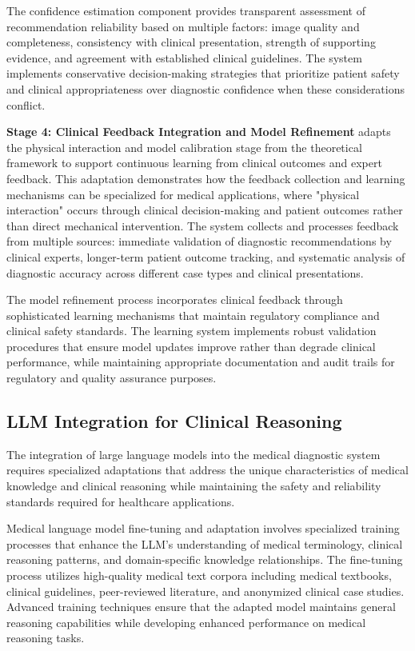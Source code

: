 The confidence estimation component provides transparent assessment of recommendation reliability based on multiple factors: image quality and completeness, consistency with clinical presentation, strength of supporting evidence, and agreement with established clinical guidelines. The system implements conservative decision-making strategies that prioritize patient safety and clinical appropriateness over diagnostic confidence when these considerations conflict.

\textbf{Stage 4: Clinical Feedback Integration and Model Refinement} adapts the physical interaction and model calibration stage from the theoretical framework to support continuous learning from clinical outcomes and expert feedback. This adaptation demonstrates how the feedback collection and learning mechanisms can be specialized for medical applications, where "physical interaction" occurs through clinical decision-making and patient outcomes rather than direct mechanical intervention. The system collects and processes feedback from multiple sources: immediate validation of diagnostic recommendations by clinical experts, longer-term patient outcome tracking, and systematic analysis of diagnostic accuracy across different case types and clinical presentations.

The model refinement process incorporates clinical feedback through sophisticated learning mechanisms that maintain regulatory compliance and clinical safety standards. The learning system implements robust validation procedures that ensure model updates improve rather than degrade clinical performance, while maintaining appropriate documentation and audit trails for regulatory and quality assurance purposes.

\subsection{LLM Integration for Clinical Reasoning}

The integration of large language models into the medical diagnostic system requires specialized adaptations that address the unique characteristics of medical knowledge and clinical reasoning while maintaining the safety and reliability standards required for healthcare applications.

Medical language model fine-tuning and adaptation involves specialized training processes that enhance the LLM's understanding of medical terminology, clinical reasoning patterns, and domain-specific knowledge relationships. The fine-tuning process utilizes high-quality medical text corpora including medical textbooks, clinical guidelines, peer-reviewed literature, and anonymized clinical case studies. Advanced training techniques ensure that the adapted model maintains general reasoning capabilities while developing enhanced performance on medical reasoning tasks.

